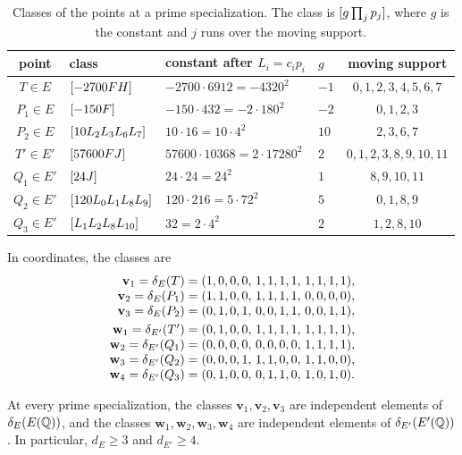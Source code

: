 \begin{table}[htbp]
\centering
\caption{Classes of the points at a prime specialization. The class is $[g\prod_{j}p_j]$, where $g$ is the constant and $j$ runs over the moving support.}\label{tab:r5-classes}
\begin{tabular}{clllc}
\toprule
point & class & constant after $L_i=c_ip_i$ & $g$ & moving support\\
\midrule
$T\in E$ & $[-2700FH]$ & $-2700\cdot6912=-4320^2$ & $-1$ & $0,1,2,3,4,5,6,7$\\
$P_1\in E$ & $[-150F]$ & $-150\cdot432=-2\cdot180^2$ & $-2$ & $0,1,2,3$\\
$P_2\in E$ & $[10L_2L_3L_6L_7]$ & $10\cdot16=10\cdot4^2$ & $10$ & $2,3,6,7$\\
\midrule
$T'\in E'$ & $[57600FJ]$ & $57600\cdot10368=2\cdot17280^2$ & $2$ & $0,1,2,3,8,9,10,11$\\
$Q_1\in E'$ & $[24J]$ & $24\cdot24=24^2$ & $1$ & $8,9,10,11$\\
$Q_2\in E'$ & $[120L_0L_1L_8L_9]$ & $120\cdot216=5\cdot72^2$ & $5$ & $0,1,8,9$\\
$Q_3\in E'$ & $[L_1L_2L_8L_{10}]$ & $32=2\cdot4^2$ & $2$ & $1,2,8,10$\\
\bottomrule
\end{tabular}
\end{table}

In coordinates, the classes are
\begin{equation}\label{r5:class-vectors}
\begin{array}{r@{\;}c@{\;}l}
\mathbf v_1=\delta_E(T)&=&(1,0,0,0,\,1,1,1,1,\,1,1,1,1),\\
\mathbf v_2=\delta_E(P_1)&=&(1,1,0,0,\,1,1,1,1,\,0,0,0,0),\\
\mathbf v_3=\delta_E(P_2)&=&(0,1,0,1,\,0,0,1,1,\,0,0,1,1),\\[3pt]
\mathbf w_1=\delta_{E'}(T')&=&(0,1,0,0,\,1,1,1,1,\,1,1,1,1),\\
\mathbf w_2=\delta_{E'}(Q_1)&=&(0,0,0,0,\,0,0,0,0,\,1,1,1,1),\\
\mathbf w_3=\delta_{E'}(Q_2)&=&(0,0,0,1,\,1,1,0,0,\,1,1,0,0),\\
\mathbf w_4=\delta_{E'}(Q_3)&=&(0,1,0,0,\,0,1,1,0,\,1,0,1,0).
\end{array}
\end{equation}

\begin{lemma}\label{lem:r5-lower}
At every prime specialization, the classes $\mathbf v_1,\mathbf v_2,\mathbf v_3$ are independent elements of $\delta_E(E(\mathbb Q))$, and the classes $\mathbf w_1,\mathbf w_2,\mathbf w_3,\mathbf w_4$ are independent elements of $\delta_{E'}(E'(\mathbb Q))$. In particular, $d_E\ge3$ and $d_{E'}\ge4$.
\end{lemma}

